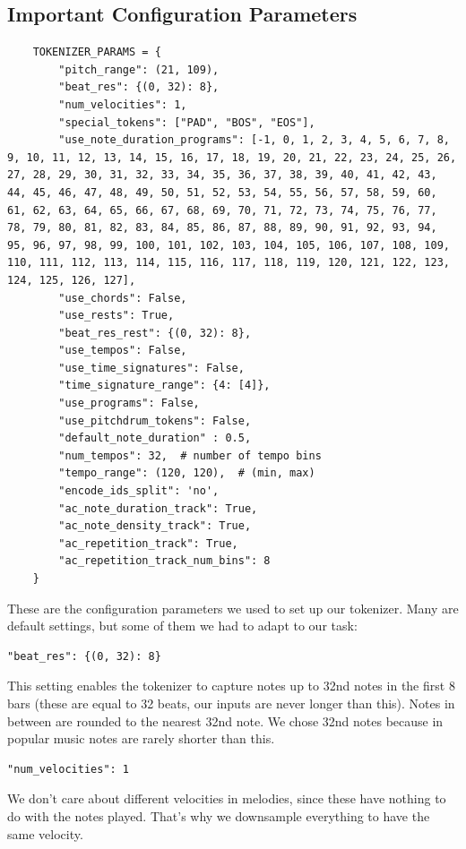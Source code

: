 \documentclass[a4paper,12pt]{extarticle}
\begin{document}
\subsection{Important Configuration Parameters}
\begin{lstlisting}
    TOKENIZER_PARAMS = {
        "pitch_range": (21, 109),
        "beat_res": {(0, 32): 8},
        "num_velocities": 1,
        "special_tokens": ["PAD", "BOS", "EOS"],
        "use_note_duration_programs": [-1, 0, 1, 2, 3, 4, 5, 6, 7, 8, 9, 10, 11, 12, 13, 14, 15, 16, 17, 18, 19, 20, 21, 22, 23, 24, 25, 26, 27, 28, 29, 30, 31, 32, 33, 34, 35, 36, 37, 38, 39, 40, 41, 42, 43, 44, 45, 46, 47, 48, 49, 50, 51, 52, 53, 54, 55, 56, 57, 58, 59, 60, 61, 62, 63, 64, 65, 66, 67, 68, 69, 70, 71, 72, 73, 74, 75, 76, 77, 78, 79, 80, 81, 82, 83, 84, 85, 86, 87, 88, 89, 90, 91, 92, 93, 94, 95, 96, 97, 98, 99, 100, 101, 102, 103, 104, 105, 106, 107, 108, 109, 110, 111, 112, 113, 114, 115, 116, 117, 118, 119, 120, 121, 122, 123, 124, 125, 126, 127],
        "use_chords": False,
        "use_rests": True,
        "beat_res_rest": {(0, 32): 8},
        "use_tempos": False,
        "use_time_signatures": False,
        "time_signature_range": {4: [4]},
        "use_programs": False,
        "use_pitchdrum_tokens": False,
        "default_note_duration" : 0.5, 
        "num_tempos": 32,  # number of tempo bins
        "tempo_range": (120, 120),  # (min, max)
        "encode_ids_split": 'no',
        "ac_note_duration_track": True,
        "ac_note_density_track": True,
        "ac_repetition_track": True,
        "ac_repetition_track_num_bins": 8
    }
\end{lstlisting}
These are the configuration parameters we used to set up our tokenizer. Many are default settings, but some of them we had to adapt to our task:\newline
\begin{lstlisting}
"beat_res": {(0, 32): 8}   
\end{lstlisting}
This setting enables the tokenizer to capture notes up to 32nd notes in the first 8 bars (these are equal to 32 beats, our inputs are never longer than this). Notes in between are rounded to the nearest 32nd note. We chose 32nd notes because in popular music notes are rarely shorter than this. \newline
\begin{lstlisting}
"num_velocities": 1
\end{lstlisting}
We don't care about different velocities in melodies, since these have nothing to do with the notes played. That's why we downsample everything to have the same velocity. \newline
\end{document}

